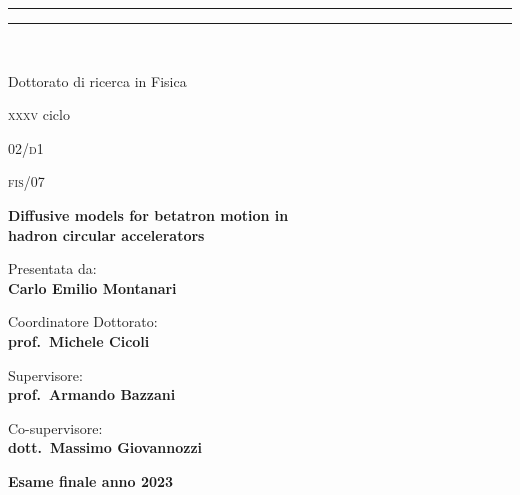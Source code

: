 \begin{titlepage}
\begin{center}
{
{{\Large{\textsc{}}}}} 
{\rule[0.1cm]{\textwidth}{0.1mm}}
{\rule[0.5cm]{\textwidth}{0.6mm}}
\\

\vspace{2em}

\Large{Dottorato di ricerca in Fisica}

\vspace{1ex}

\large{\textsc{xxxv} ciclo}
\end{center}

\vspace{3em}

 02/\textsc{d}1

\vspace{1ex}

 \textsc{fis}/07

\vfill

\begin{center}{
{\LARGE{\bf Diffusive models for betatron motion in \\ hadron circular accelerators}}\\
}\end{center}

\vfill %

\noindent
\begin{minipage}{.45\textwidth}
\begin{flushleft}
{\color{unibo}Presentata da:}\\
\textbf{Carlo Emilio Montanari}
\end{flushleft}
\end{minipage}

\vfill

\noindent
\begin{minipage}[t]{.45\textwidth}
{\color{unibo}Coordinatore Dottorato:}\\
\textbf{prof.\ Michele Cicoli}
\end{minipage}
\hfill
\begin{minipage}[t]{.45\textwidth}
\begin{flushright}
{\color{unibo}Supervisore:}\\
\textbf{prof.\ Armando Bazzani}\\

\vspace{1em}

{\color{unibo}Co-supervisore:}\\
\textbf{dott.\ Massimo Giovannozzi}
\end{flushright}
\end{minipage}

\vfill

\begin{center}
\textbf{Esame finale anno 2023}
\end{center}
\end{titlepage}
